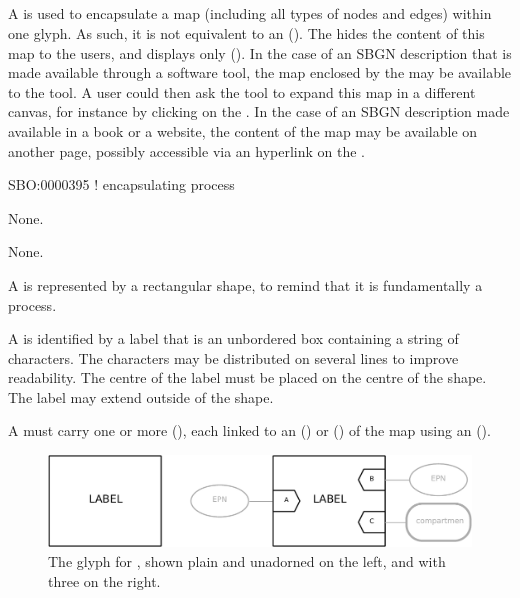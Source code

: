 \subsection{}\label{sec:submap}

A  is used to encapsulate a map (including all types of nodes and edges) within one glyph.
As such, it is not equivalent to an  ().
The  hides the content of this map to the users, and displays only  ().
In the case of an SBGN description that is made available through a software tool, the map enclosed by the   may be available to the tool.
A user could then ask the tool to expand this map in a different canvas, for instance by clicking on the .
In the case of an SBGN description made available in a book or a website, the content of the map may be available on another page, possibly accessible via an hyperlink on the .

\begin{glyphDescription}

\glyphSboTerm
SBO:0000395 ! encapsulating process

\glyphIncoming
None.

\glyphOutgoing
None.

\glyphContainer
A  is represented by a rectangular shape, to remind that it is fundamentally a process.

\glyphLabel
A  is identified by a label that is an unbordered box containing a string of characters.
The characters may be distributed on several lines to improve readability.
The centre of the label must be placed on the centre of the shape.
The label may extend outside of the shape.

\glyphAux
A  must carry one or more  (), each linked to an  () or  () of the map using an  ().

\end{glyphDescription}

\begin{figure}
\begin{center}
\includegraphics[scale=0.7]{images/build/submap.pdf}
\caption{The \PD glyph for , shown plain and unadorned on the left, and with three  on the right.}
\label{fig:submap}
\end{center}
\end{figure}

